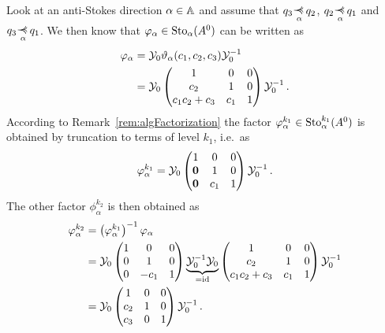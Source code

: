 \begin{exmp}\label{exmp:decompositionHere}
  Look at an anti-Stokes direction $\alpha\in\mathbb{A}$ and assume that
  $q_3\myrel{\alpha}q_2$, $q_2\myrel{\alpha}q_1$ and $q_3\myrel{\alpha}q_1$. We
  then know that $\varphi_\alpha\in \operatorname{Sto}_\alpha(A^0)$ can be written as
  \begin{align*}
    \varphi_\alpha &= \mathcal{Y}_{0}\vartheta_\alpha(c_1,c_2,c_3) \mathcal{Y}_{0}^{-1}
    \\&
    =\mathcal{Y}_{0}
    \begin{pmatrix} 1 & 0 & 0 \\c_2 & 1 & 0 \\c_1c_2+c_3 & c_1 & 1 \end{pmatrix}
    \mathcal{Y}_{0}^{-1}
    \,.
  \end{align*}
  According to Remark~\ref{rem:algFactorization} the factor
  $\varphi_\alpha^{k_1}\in\operatorname{Sto}_\alpha^{k_1}(A^0)$ is obtained by truncation to
  terms of level $k_1$, i.e.\ as
  \[
    \varphi_\alpha^{k_1}=
    \mathcal{Y}_{0}
    \begin{pmatrix}
      1 & 0 & 0
    \\\text{\boldmath $0$} & 1 & 0
    \\\text{\boldmath $0$} & c_1 & 1
    \end{pmatrix}
    \mathcal{Y}_{0}^{-1}
    \,.
  \]
  The other factor $\phi_\alpha^{k_2}$ is then obtained as
  \begin{align*}
    \phi_\alpha^{k_2}&=
    \left(\phi_\alpha^{k_1}\right)^{-1}
    \phi_\alpha
  \\&=\cY_{0}
    \begin{pmatrix}
      1     & 0    & 0
    \\0     & 1    & 0
    \\0     & -c_1 & 1
    \end{pmatrix}
    \underset{=\id}{\underbrace{%
        \cY_{0}^{-1}
        \cY_{0}
    }}
    \begin{pmatrix} 1 & 0 & 0 \\c_2 & 1 & 0 \\c_1c_2+c_3 & c_1 & 1 \end{pmatrix}
    \cY_{0}^{-1}
  \\&=\cY_{0}
    \begin{pmatrix}
      1     & 0 & 0
    \\c_2     & 1          & 0
    \\c_3     & 0          & 1
    \end{pmatrix}
    \cY_{0}^{-1}
    \,.
  \end{align*}
\end{exmp}
